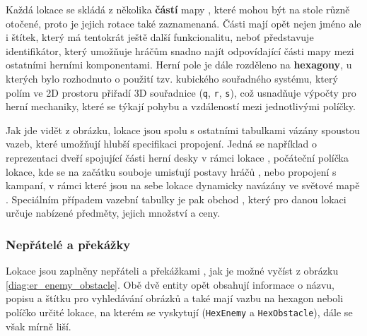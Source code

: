 Každá lokace se skládá z několika \textbf{částí} mapy , které mohou být na stole různě otočené, proto je jejich rotace  také zaznamenaná. Části mají opět nejen jméno ale i štítek, který má tentokrát ještě další funkcionalitu, neboť představuje identifikátor, který umožňuje hráčům snadno najít odpovídající části mapy mezi ostatními herními komponentami. Herní pole je dále rozděleno na \textbf{hexagony}, u kterých bylo rozhodnuto o použití tzv. kubického souřadného systému, který polím ve 2D prostoru přiřadí 3D souřadnice (\texttt{q}, \texttt{r}, \texttt{s}), což usnadňuje výpočty pro herní mechaniky, které se týkají pohybu a vzdáleností mezi jednotlivými políčky.

Jak jde vidět z obrázku, lokace jsou spolu s ostatními tabulkami vázány spoustou vazeb, které umožňují hlubší specifikaci propojení. Jedná se například o reprezentaci dveří spojující části herní desky v rámci lokace , počáteční políčka lokace, kde se na začátku souboje umisťují postavy hráčů , nebo propojení s kampaní, v rámci které jsou na sebe lokace dynamicky navázány ve světové mapě . Speciálním případem vazební tabulky je pak obchod , který pro danou lokaci určuje nabízené předměty, jejich množství a ceny.

\subsubsection*{Nepřátelé a překážky}
\label{subsubsec:schema_enemy_obstacle}

Lokace jsou zaplněny nepřáteli  a překážkami , jak je možné vyčíst z obrázku \ref{diag:er_enemy_obstacle}. Obě dvě entity opět obsahují informace o názvu, popisu a štítku pro vyhledávání obrázků a také mají vazbu na hexagon neboli políčko určité lokace, na kterém se vyskytují (\texttt{HexEnemy} a \texttt{HexObstacle}), dále se však mírně liší.

